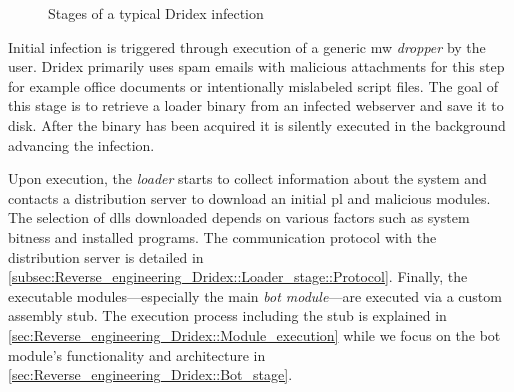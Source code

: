 \begin{figure}[htb]
    \centering
    \caption{Stages of a typical Dridex infection\label{fig:Dridex::Infection_process}}
\end{figure}

Initial infection is triggered through execution of a generic \gls{mw} \emph{dropper} by the user.
Dridex primarily uses spam emails with malicious attachments for this step for example office documents or intentionally mislabeled script files.
The goal of this stage is to retrieve a loader binary from an infected webserver and save it to disk.
After the binary has been acquired it is silently executed in the background advancing the infection.

Upon execution, the \emph{loader} starts to collect information about the system and contacts a distribution server to download an initial \gls{pl} and malicious modules.
The selection of \acrshort{dll}s downloaded depends on various factors such as system bitness and installed programs.
The communication protocol with the distribution server is detailed in \autoref{subsec:Reverse_engineering_Dridex::Loader_stage::Protocol}.
Finally, the executable modules---especially the main \emph{\gls{bot} module}---are executed via a custom assembly stub.
The execution process including the stub is explained in \autoref{sec:Reverse_engineering_Dridex::Module_execution} while we focus on the bot module's functionality and architecture in \autoref{sec:Reverse_engineering_Dridex::Bot_stage}.

